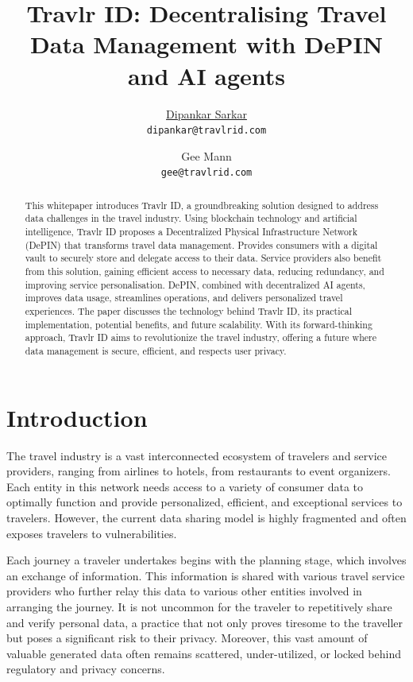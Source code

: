 \documentclass{article}
\title{Travlr ID: Decentralising Travel Data Management with DePIN and AI agents}
\author{\href{https://www.dipankar.name}{\hspace{1mm}Dipankar Sarkar} \\
  \texttt{dipankar@travlrid.com} \\
        \and
	Gee Mann \\
	\texttt{gee@travlrid.com} \\
 }
\begin{document}
\maketitle

\begin{abstract}
This whitepaper introduces Travlr ID, a groundbreaking solution designed to address data challenges in the travel industry. Using blockchain technology and artificial intelligence, Travlr ID proposes a Decentralized Physical Infrastructure Network (DePIN) that transforms travel data management. Provides consumers with a digital vault to securely store and delegate access to their data. Service providers also benefit from this solution, gaining efficient access to necessary data, reducing redundancy, and improving service personalisation. DePIN, combined with decentralized AI agents, improves data usage, streamlines operations, and delivers personalized travel experiences. The paper discusses the technology behind Travlr ID, its practical implementation, potential benefits, and future scalability. With its forward-thinking approach, Travlr ID aims to revolutionize the travel industry, offering a future where data management is secure, efficient, and respects user privacy.
\end{abstract}

\pagebreak

\tableofcontents

\pagebreak

\section{Introduction}

The travel industry is a vast interconnected ecosystem of travelers and service providers, ranging from airlines to hotels, from restaurants to event organizers. Each entity in this network needs access to a variety of consumer data to optimally function and provide personalized, efficient, and exceptional services to travelers. However, the current data sharing model is highly fragmented and often exposes travelers to vulnerabilities.

Each journey a traveler undertakes begins with the planning stage, which involves an exchange of information. This information is shared with various travel service providers who further relay this data to various other entities involved in arranging the journey. It is not uncommon for the traveler to repetitively share and verify personal data, a practice that not only proves tiresome to the traveller but poses a significant risk to their privacy. Moreover, this vast amount of valuable generated data often remains scattered, under-utilized, or locked behind regulatory and privacy concerns.
\end{document}
